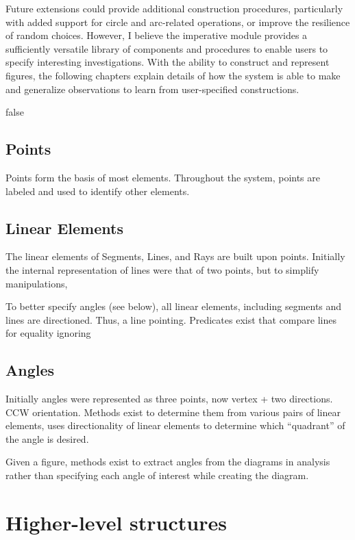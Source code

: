 Future extensions could provide additional construction procedures,
particularly with added support for circle and arc-related operations,
or improve the resilience of random choices. However, I believe the
imperative module provides a sufficiently versatile library of
components and procedures to enable users to specify interesting
investigations. With the ability to construct and represent figures,
the following chapters explain details of how the system is able to
make and generalize observations to learn from user-specified
constructions.



\if false

\subsection{Points}

Points form the basis of most elements. Throughout the system, points
are labeled and used to identify other elements.

\subsection{Linear Elements}

The linear elements of Segments, Lines, and Rays are built upon
points. Initially the internal representation of lines were that of
two points, but to simplify manipulations,

To better specify angles (see below), all linear elements, including
segments and lines are directioned. Thus, a line pointing. Predicates
exist that compare lines for equality ignoring

\subsection{Angles}

Initially angles were represented as three points, now vertex + two
directions. CCW orientation. Methods exist to determine them from
various pairs of linear elements, uses directionality of linear
elements to determine which ``quadrant'' of the angle is desired.

Given a figure, methods exist to extract angles from the diagrams in
analysis rather than specifying each angle of interest while creating
the diagram.

\section{Higher-level structures}

